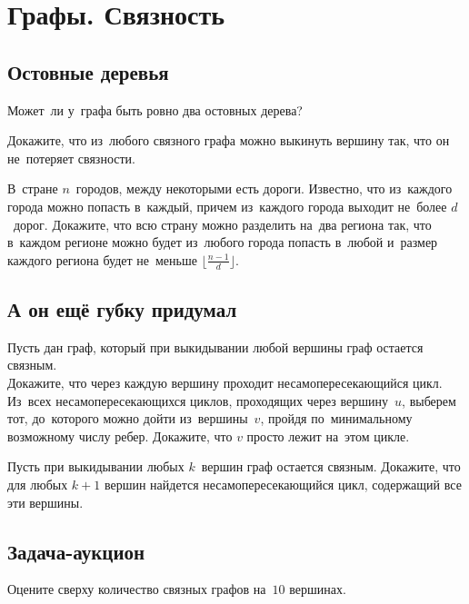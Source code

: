 
\section*{Графы. Связность}



\subsection*{Остовные деревья}

\begin{problems}

\item
Может~ли у~графа быть ровно два остовных дерева?

\item
Докажите, что из~любого связного графа можно выкинуть вершину так, что он
не~потеряет связности.

\item
В~стране $n$~городов, между некоторыми есть дороги.
Известно, что из~каждого города можно попасть в~каждый, причем из~каждого
города выходит не~более $d$~дорог.
Докажите, что всю страну можно разделить на~два региона так, что в~каждом
регионе можно будет из~любого города попасть в~любой и~размер каждого региона
будет не~меньше $\bigl \lfloor \frac{n - 1}{d} \bigr \rfloor$.

\end{problems}


\subsection*{А он ещё губку придумал}

\begin{problems}

\item
Пусть дан граф, который при выкидывании любой вершины граф остается связным.
\\
\subproblem
Докажите, что через каждую вершину проходит несамопересекающийся цикл.
\\
\subproblem
Из~всех несамопересекающихся циклов, проходящих через вершину~$u$, выберем тот,
до~которого можно дойти из~вершины~$v$, пройдя по~минимальному возможному числу
ребер.
Докажите, что $v$ просто лежит на~этом цикле.

\item
Пусть при выкидывании любых $k$~вершин граф остается связным.
Докажите, что для любых $k + 1$ вершин найдется несамопересекающийся цикл,
содержащий все эти вершины.

\end{problems}


\subsection*{Задача-аукцион}

\begin{problems}

\item
Оцените сверху количество связных графов на~$10$ вершинах.

\end{problems}

